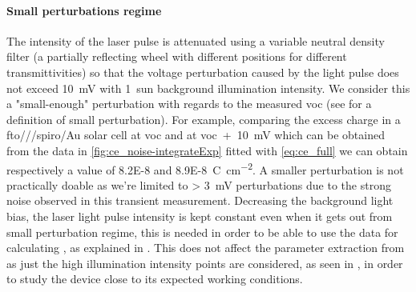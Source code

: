\paragraph{Small perturbations regime}\label{tpv_perturbation}
The intensity of the laser pulse is attenuated using a variable neutral density filter (a partially reflecting wheel with different positions for different transmittivities) so that the voltage perturbation caused by the light pulse does not exceed \SI{10}{\mV} with 1~sun background illumination intensity.
We consider this a "small-enough" perturbation with regards to the measured \gls{voc} (see  for a definition of small perturbation).
For example, comparing the excess charge in a \gls{fto}\-/\-/\-/\gls{spiro}\-/Au solar cell at \gls{voc} and at \gls{voc}~+~\SI{10}{\mV} which can be obtained from the data in \cref{fig:ce_noise-integrateExp} fitted with \cref{eq:ce_full} we can obtain respectively a value of \SI{8.2E-8}{} and \SI{8.9E-8}{\coulomb\per\square\cm}.
A smaller perturbation is not practically doable as we're limited to \SI{> 3}{\mV} perturbations due to the strong noise observed in this transient measurement.
Decreasing the background light bias, the laser light pulse intensity is kept constant even when it gets out from small perturbation regime, this is needed in order to be able to use the  data for calculating , as explained in .
This does not affect the parameter extraction from  as just the high illumination intensity points are considered, as seen in , in order to study the device close to its expected working conditions.


